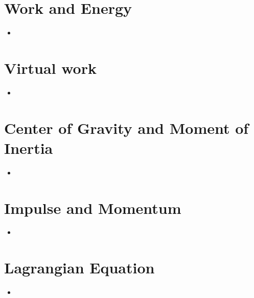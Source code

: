 \documentclass[8pt]{report}
\begin{document}
\chapter{Work and Energy}
	\begin{itemize}
		\item
	\end{itemize}
\chapter{Virtual work}
	\begin{itemize}
		\item
	\end{itemize}
\chapter{Center of Gravity and Moment of Inertia}
	\begin{itemize}
		\item
	\end{itemize}
\chapter{Impulse and Momentum}
	\begin{itemize}
		\item
	\end{itemize}
\chapter{Lagrangian Equation}
	\begin{itemize}
		\item
	\end{itemize}
\end{document}

